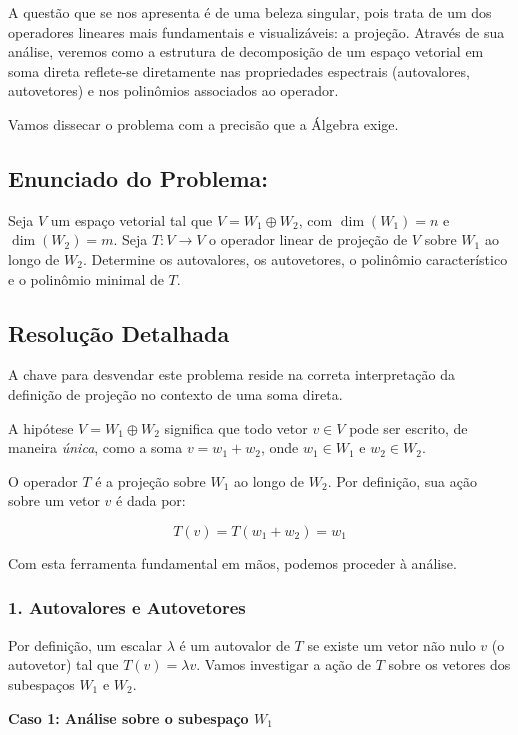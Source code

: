 A questão que se nos apresenta é de uma beleza singular, pois trata de um dos operadores lineares
mais fundamentais e visualizáveis: a projeção. Através de sua análise, veremos como a estrutura de
decomposição de um espaço vetorial em soma direta reflete-se diretamente nas propriedades
espectrais (autovalores, autovetores) e nos polinômios associados ao operador.

Vamos dissecar o problema com a precisão que a Álgebra exige.

\subsection*{Enunciado do Problema:}

Seja $V$ um espaço vetorial tal que $V = W_1 \oplus W_2$, com $\dim(W_1)=n$ e $\dim(W_2)=m$. Seja
$T:V \to V$ o operador linear de projeção de $V$ sobre $W_1$ ao longo de $W_2$. Determine os
autovalores, os autovetores, o polinômio característico e o polinômio minimal de $T$.

\subsection*{Resolução Detalhada}

A chave para desvendar este problema reside na correta interpretação da definição de projeção no
contexto de uma soma direta.

A hipótese $V=W_1 \oplus W_2$ significa que todo vetor $v \in V$ pode ser escrito, de maneira \textit{única},
como a soma $v=w_1+w_2$, onde $w_1 \in W_1$ e $w_2 \in W_2$.

O operador $T$ é a projeção sobre $W_1$ ao longo de $W_2$. Por definição, sua ação sobre um vetor $v$ é
dada por:

\[
T(v) = T(w_1+w_2)=w_1
\]

Com esta ferramenta fundamental em mãos, podemos proceder à análise.

\subsubsection*{1. Autovalores e Autovetores}

Por definição, um escalar $\lambda$ é um autovalor de $T$ se existe um vetor não nulo $v$ (o autovetor) tal que
$T(v)=\lambda v$. Vamos investigar a ação de $T$ sobre os vetores dos subespaços $W_1$ e $W_2$.

\textbf{Caso 1: Análise sobre o subespaço $W_1$}


